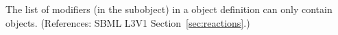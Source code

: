The list of modifiers (in the \ListOfModifiers subobject) in a \Reaction
object definition can only contain \ModifierSpeciesReference objects.
(References: SBML L3V1 Section~\ref{sec:reactions}.)
